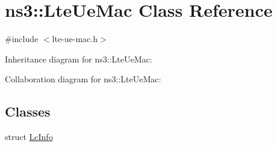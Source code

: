 \hypertarget{classns3_1_1LteUeMac}{}\section{ns3\+:\+:Lte\+Ue\+Mac Class Reference}
\label{classns3_1_1LteUeMac}


{\ttfamily \#include $<$lte-\/ue-\/mac.\+h$>$}



Inheritance diagram for ns3\+:\+:Lte\+Ue\+Mac\+:


Collaboration diagram for ns3\+:\+:Lte\+Ue\+Mac\+:
\subsection*{Classes}
\begin{DoxyCompactItemize}
\item 
struct \hyperlink{structns3_1_1LteUeMac_1_1LcInfo}{Lc\+Info}
\end{DoxyCompactItemize}
